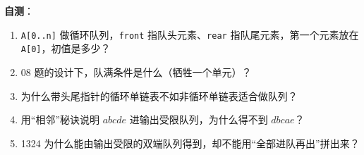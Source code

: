 \documentclass[10.5pt,a4paper,oneside]{article}
\providecommand{\tightlist}{\setlength{\itemsep}{2pt}\setlength{\parskip}{0pt}}
\begin{document}
\begin{summarybox}
\textbf{自测}：

\begin{enumerate}
\def\labelenumi{\arabic{enumi}.}
\tightlist
\item
  \texttt{A{[}0..n{]}} 做循环队列，\texttt{front}
  指队头元素、\texttt{rear} 指队尾元素，第一个元素放在
  \texttt{A{[}0{]}}，初值是多少？
\item
  08 题的设计下，队满条件是什么（牺牲一个单元）？
\item
  为什么带头尾指针的循环单链表不如非循环单链表适合做队列？
\item
  用“相邻”秘诀说明 \(abcde\) 进输出受限队列，为什么得不到 \(dbcae\)？
\item
  1324 为什么能由输出受限的双端队列得到，却不能用“全部进队再出”拼出来？
\end{enumerate}

\end{summarybox}
\end{document}
